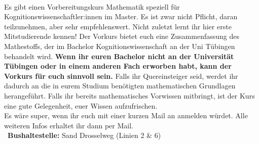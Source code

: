 \begin{description}


\ifkogwiss
    \ifmaster
        \item[\parbox{\linewidth}{Mathevorkurs-Master -- \kogniMasterMatheVorkursBeginn bis \kogniMasterMatheVorkursEnde \YEAR,\\ 09:00--17:00 Uhr, Sand C214}]\ \vspace{.355\baselineskip} \\ %
        Es gibt einen Vorbereitungskurs Mathematik speziell für Kognitionswissenschaftler:innen im Master.
        Es ist zwar nicht Pflicht, daran teilzunehmen, aber sehr empfehlenswert. Nicht zuletzt lernt ihr hier erste Mitstudierende kennen! Der Vorkurs bietet euch eine Zusammenfassung des Mathestoffs, der im Bachelor Kognitionswissenschaft an der Uni Tübingen behandelt wird.
        \textbf{Wenn ihr euren Bachelor nicht an der Universität Tübingen oder in einem anderen Fach erworben habt, kann der Vorkurs für euch sinnvoll sein.} Falls ihr Quereinsteiger seid, werdet ihr dadurch an die in eurem Studium benötigten mathematischen Grundlagen herangeführt. Falls ihr bereits mathematisches Vorwissen mitbringt, ist der Kurs eine gute Gelegenheit, euer Wissen aufzufrischen.\\
        Es wäre super, wenn ihr euch mit einer kurzen Mail an \texttt{\kogniMasterMatheVorkursAnmeldeMail} anmelden würdet. Alle weiteren Infos erhaltet ihr dann per Mail.\\
        ~\textbf{Bushaltestelle:} Sand Drosselweg (Linien 2 \& 6)
    \fi
\fi


\end{description}
